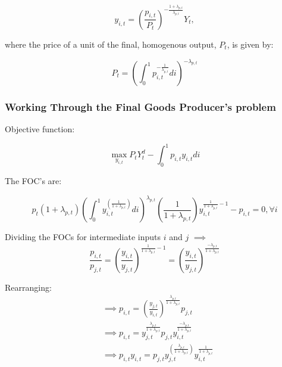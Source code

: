 \documentclass[article,11pt,letterpaper,fleqn]{article}
\theoremstyle{definition}
\numberwithin{equation}{section}
\begin{document}
\begin{equation}
y_{i,t}=\left(\frac{p_{i,t}}{P_{t}}\right)^{-\frac{1+\lambda_{p,t}}{\lambda_{p,t}}}Y_{t} ,
\end{equation}

\noindent\noindent where the price of a unit of the final, homogenous output, $P_{t}$, is given by:

\begin{equation}
P_{t}=\left(\int_{0}^{1}p_{i,t}^{-\frac{1}{\lambda_{p,t}}}di\right)^{-\lambda_{p,t}}
\end{equation}

\subsubsection{Working Through the Final Goods Producer's problem}

Objective function:

\begin{equation}
\max_{y_{i,t}} P_{t}Y_{t}^{d} - \int_{0}^{1}p_{i,t}y_{i,t}di
\end{equation}

The FOC's are:

\begin{equation}
p_{t}(1+\lambda_{p,t})\left(\int_{0}^{1}y_{i,t}^{\left(\frac{1}{1+\lambda_{p,t}}\right)}di\right)^{\lambda_{p,t}}\left(\frac{1}{1+\lambda_{p,t}}\right)y_{i,t}^{\frac{1}{1+\lambda_{p,t}}-1}-p_{i,t} = 0, \forall i
\end{equation}

Dividing the FOCs for intermediate inputs $i$ and $j$ $\implies$
\begin{equation}
\frac{p_{i,t}}{p_{j,t}} = \left(\frac{y_{i,t}}{y_{j,t}}\right)^{\frac{1}{1+\lambda_{p,t}}-1} = \left(\frac{y_{i,t}}{y_{j,t}}\right)^{\frac{-\lambda_{p,t}}{1+\lambda_{p,t}}}
\end{equation}

Rearranging:
\begin{equation}
\begin{split}
&\implies p_{i,t} = \left(\frac{y_{j,t}}{y_{i,t}}\right)^{\frac{\lambda_{p,t}}{1+\lambda_{p,t}}}p_{j,t} \\
& \implies p_{i,t} = y_{j,t}^{\frac{\lambda_{p,t}}{1+\lambda_{p,t}}}p_{j,t}y_{i,t}^{\frac{-\lambda_{p,t}}{1+\lambda_{p,t}}} \\
& \implies p_{i,t}y_{i,t} = p_{j,t}y_{j,t}^{\left(\frac{\lambda_{p,t}}{1+\lambda_{p,t}}\right)}y_{i,t}^{\frac{1}{1+\lambda_{p,t}}}
\end{split}
\end{equation}
\end{document}
